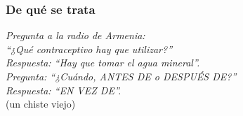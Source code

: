 \protect\hypertarget{M1}{}{}

\subsubsection*{De qué se trata}
\label{de-quuxe9-se-trata}

\noindent
\textit{Pregunta a la radio de Armenia:}\\
\textit{``¿Qué contraceptivo hay que utilizar?''}\\
\textit{Respuesta: ``Hay que tomar el agua mineral''.}\\
\textit{Pregunta: ``¿Cuándo, ANTES DE o DESPUÉS DE?''}\\
\textit{Respuesta: ``EN VEZ DE''.}\\
(un chiste viejo)\\
% 
% 

